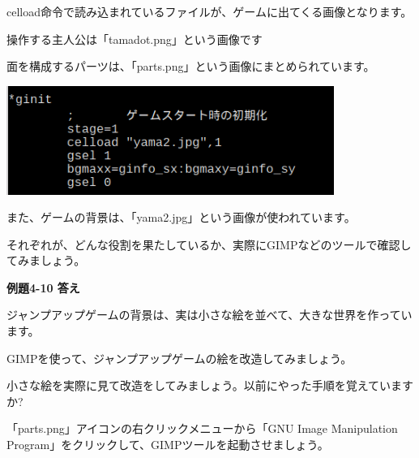 \documentclass[a4paper,12pt]{jarticle}
\begin{document}
\bigskip
\bigskip
\bigskip

celload命令で読み込まれているファイルが、ゲームに出てくる画像となります。

操作する主人公は「tamadot.png」という画像です

面を構成するパーツは、「parts.png」という画像にまとめられています。

\bigskip
\bigskip

\begin{minipage}{9.781cm}
\centering
{\upshape
\includegraphics[keepaspectratio,width=10.689cm,height=3.538cm]{text04-img/text04-img027.png}}
\end{minipage}

\bigskip
\bigskip
\bigskip

また、ゲームの背景は、「yama2.jpg」という画像が使われています。

それぞれが、どんな役割を果たしているか、実際にGIMPなどのツールで確認してみましょう。


\bigskip


\bigskip

{\bfseries
例題4-10 答え}


\bigskip

ジャンプアップゲームの背景は、実は小さな絵を並べて、大きな世界を作っています。

GIMPを使って、ジャンプアップゲームの絵を改造してみましょう。

小さな絵を実際に見て改造をしてみましょう。以前にやった手順を覚えていますか?

「parts.png」アイコンの右クリックメニューから「GNU Image Manipulation Program」をクリックして、GIMPツールを起動させましょう。

\bigskip
\bigskip
\end{document}

